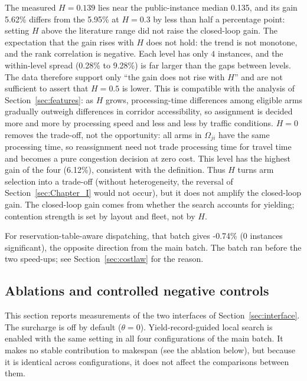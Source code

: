 \documentclass[manuscript,screen,review]{acmart}
\newcommand{\GainIntegMatrixLo}{0.28\%}
\newcommand{\GainIntegMatrixHi}{9.28\%}
\newcommand{\GainProbePre}{-0.74\%}      %
\newcommand{\GainIntegHZero}{6.12\%}
\newcommand{\GainIntegHLow}{5.62\%}      %
\newcommand{\GainIntegHMid}{5.95\%}      %
\newcommand{\MatrixHMeasLow}{0.139}      %
\newcommand{\PubHMed}{0.135}             %
\begin{document}
The measured $H=\MatrixHMeasLow$ lies near the public-instance median \PubHMed{}, and its gain \GainIntegHLow{} differs from the \GainIntegHMid{} at $H=0.3$ by less than half a percentage point: setting $H$ above the literature range did not raise the closed-loop gain.
The expectation that the gain rises with $H$ does not hold: the trend is not monotone, and the rank correlation is negative. Each level has only $4$ instances, and the within-level spread (\GainIntegMatrixLo{} to \GainIntegMatrixHi{}) is far larger than the gaps between levels. The data therefore support only ``the gain does not rise with $H$'' and are not sufficient to assert that $H=0.5$ is lower.
This is compatible with the analysis of Section~\ref{sec:features}: as $H$ grows, processing-time differences among eligible arms gradually outweigh differences in corridor accessibility, so assignment is decided more and more by processing speed and less and less by traffic conditions.
$H=0$ removes the trade-off, not the opportunity: all arms in $\Omega_{ji}$ have the same processing time, so reassignment need not trade processing time for travel time and becomes a pure congestion decision at zero cost. This level has the highest gain of the four (\GainIntegHZero{}), consistent with the definition.
Thus $H$ turns arm selection into a trade-off (without heterogeneity, the reversal of Section~\ref{sec:Chapter_I} would not occur), but it does not amplify the closed-loop gain. The closed-loop gain comes from whether the search accounts for yielding; contention strength is set by layout and fleet, not by $H$.

For reservation-table-aware dispatching, that batch gives \GainProbePre{} ($0$ instances significant), the opposite direction from the main batch. The batch ran before the two speed-ups; see Section~\ref{sec:costlaw} for the reason.

\subsection{Ablations and controlled negative controls}
\label{sec:pricing}

This section reports measurements of the two interfaces of Section~\ref{sec:interface}. The surcharge is off by default ($\theta=0$). Yield-record-guided local search is enabled with the same setting in all four configurations of the main batch. It makes no stable contribution to makespan (see the ablation below), but because it is identical across configurations, it does not affect the comparisons between them.
\end{document}
